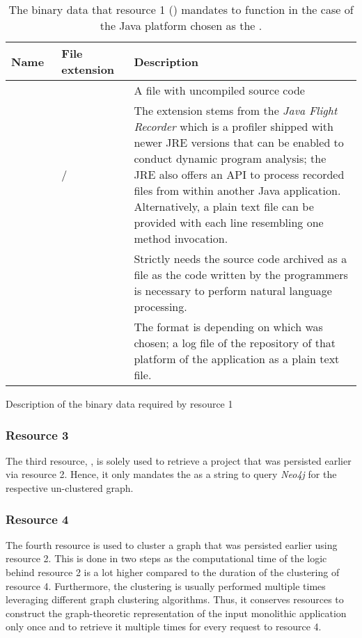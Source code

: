 \documentclass[12pt,a4paper]{report}
\begin{document}
\begin{table}[ht!]
\smaller
\def\arraystretch{1.55}
\begin{tabularx}{\textwidth}{|Y|Y|Y|}
 \hline
 Name~ & File extension~ & Description~ \\
 \hline\hline
          &  &
 A  file with uncompiled source code\\\hline
         &  /  &
 The  extension stems from the \textit{Java Flight Recorder} which is a profiler shipped with newer
 JRE versions that can be enabled to conduct dynamic program analysis; the JRE also offers an API to process
 recorded  files from within another Java application.
 Alternatively, a plain text file can be provided with each line resembling one method
 invocation. \\\hline
        &  &
 Strictly needs the source code archived as a  file as the code written by the programmers
 is necessary to perform natural language processing. \\\hline
    &  &
 The format is depending on which  was chosen; a log file of the repository of that platform of the application as a plain text file. \\\hline
\end{tabularx}
\caption{Description of the binary data required by resource 1}
\caption*{\centering
  The binary data that resource 1 () mandates to function
  in the case of the Java platform chosen as the .
}
\label{table:binary-data-resource-1}
\end{table}


\subsubsection{Resource 3}
The third resource, , is solely used to
retrieve a project that was persisted earlier via resource 2. Hence, it only
mandates the  as a string to query \textit{Neo4j} for the
respective un\hyp clustered graph.


\subsubsection{Resource 4}
The fourth resource is used to cluster a graph that was persisted earlier using
resource 2. This is done in two steps as the computational time of the logic
behind resource 2 is a lot higher compared to the duration of the clustering
of resource 4. Furthermore, the clustering is usually performed multiple times
leveraging different graph clustering algorithms. Thus, it conserves resources
to construct the graph-theoretic representation of the input monolithic application
only once and to retrieve it multiple times for every request to resource 4.
\end{document}
